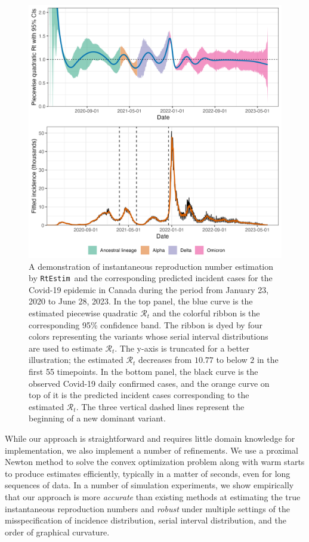 \documentclass[10pt,letterpaper]{article}
\def\RtEstim{\texttt{RtEstim}}
\def\calR{\mathcal{R}}
\begin{document}
\begin{figure}[!ht]
  \centering
  \includegraphics[width=.9\textwidth]{fig/intro-fig-new.png}
  \caption{A demonstration of instantaneous reproduction number estimation 
  by \RtEstim\ and the corresponding predicted incident cases for the Covid-19 
  epidemic in Canada during the period from January 23, 2020 to June 28, 2023. 
  In the top panel, the blue curve is the estimated piecewise quadratic $\calR_t$ 
  and the colorful ribbon is the corresponding 95\% confidence band. 
  The ribbon is dyed by four colors representing the variants whose serial interval 
  distributions are used to estimate $\calR_t$. The y-axis is truncated for 
  a better illustration; the estimated $\calR_t$ decreases from $10.77$ to below $2$
  in the first 55 timepoints. In the bottom panel, the black curve is the observed Covid-19 
  daily confirmed cases, and the orange curve on top of it is the predicted incident cases
  corresponding to the estimated $\calR_t$. The three vertical dashed lines 
  represent the beginning of a new dominant variant.}
  \label{fig:intro-fig}
\end{figure}

While our approach is straightforward and requires little domain knowledge for
implementation, we also implement a number of refinements. 
We use a proximal Newton method to solve the convex optimization problem along
with warm starts to produce estimates efficiently, typically in a matter of 
seconds, even for long sequences of data. In a number of simulation experiments, 
we show empirically that our approach is more \textit{accurate} than existing methods at 
estimating the true instantaneous reproduction numbers and \textit{robust} under multiple 
settings of the misspecification of incidence distribution, serial interval 
distribution, and the order of graphical curvature. 
\end{document}
